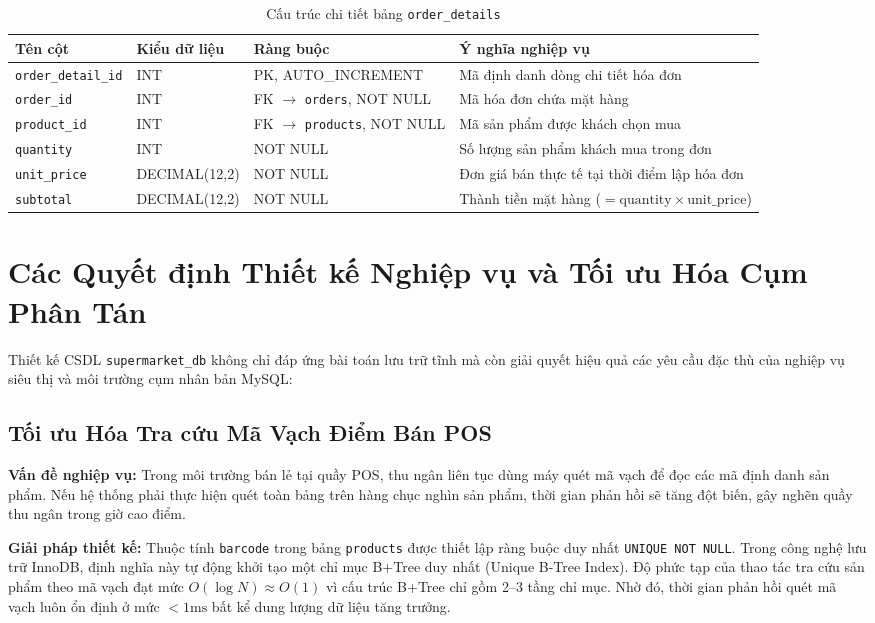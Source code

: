 \documentclass[12pt,a4paper]{report}
\begin{document}
\begin{table}[H]
\centering
\footnotesize
\caption{Cấu trúc chi tiết bảng \texttt{order\_details}}
\label{tab:dict_order_details}
\vspace{0.2cm}
\begin{tabularx}{\textwidth}{L{3.3cm} L{2.9cm} L{3.6cm} Y}
\toprule
\textbf{Tên cột} & \textbf{Kiểu dữ liệu} & \textbf{Ràng buộc} & \textbf{Ý nghĩa nghiệp vụ} \\
\midrule
\texttt{order\_detail\_id} & INT & PK, AUTO\_INCREMENT & Mã định danh dòng chi tiết hóa đơn \\
\texttt{order\_id} & INT & FK $\to$ \texttt{orders}, NOT NULL & Mã hóa đơn chứa mặt hàng \\
\texttt{product\_id} & INT & FK $\to$ \texttt{products}, NOT NULL & Mã sản phẩm được khách chọn mua \\
\texttt{quantity} & INT & NOT NULL & Số lượng sản phẩm khách mua trong đơn \\
\texttt{unit\_price} & DECIMAL(12,2) & NOT NULL & Đơn giá bán thực tế tại thời điểm lập hóa đơn \\
\texttt{subtotal} & DECIMAL(12,2) & NOT NULL & Thành tiền mặt hàng ($= \text{quantity} \times \text{unit\_price}$) \\
\bottomrule
\end{tabularx}
\end{table}

\section{Các Quyết định Thiết kế Nghiệp vụ và Tối ưu Hóa Cụm Phân Tán}
Thiết kế CSDL \texttt{supermarket\_db} không chỉ đáp ứng bài toán lưu trữ tĩnh mà còn giải quyết hiệu quả các yêu cầu đặc thù của nghiệp vụ siêu thị và môi trường cụm nhân bản MySQL:

\subsection{Tối ưu Hóa Tra cứu Mã Vạch Điểm Bán POS}
\noindent\textbf{Vấn đề nghiệp vụ:} Trong môi trường bán lẻ tại quầy POS, thu ngân liên tục dùng máy quét mã vạch để đọc các mã định danh sản phẩm. Nếu hệ thống phải thực hiện quét toàn bảng trên hàng chục nghìn sản phẩm, thời gian phản hồi sẽ tăng đột biến, gây nghẽn quầy thu ngân trong giờ cao điểm.

\vspace{0.2cm}
\noindent\textbf{Giải pháp thiết kế:} Thuộc tính \texttt{barcode} trong bảng \texttt{products} được thiết lập ràng buộc duy nhất \texttt{UNIQUE NOT NULL}. Trong công nghệ lưu trữ InnoDB, định nghĩa này tự động khởi tạo một chỉ mục B+Tree duy nhất (Unique B-Tree Index). Độ phức tạp của thao tác tra cứu sản phẩm theo mã vạch đạt mức $O(\log N) \approx O(1)$ vì cấu trúc B+Tree chỉ gồm 2--3 tầng chỉ mục. Nhờ đó, thời gian phản hồi quét mã vạch luôn ổn định ở mức $< 1\text{ms}$ bất kể dung lượng dữ liệu tăng trưởng.
\end{document}
